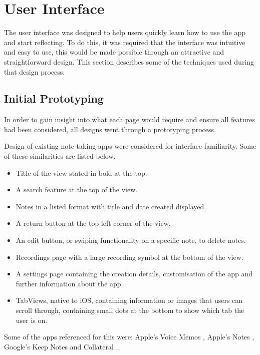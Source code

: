 \documentclass{l4proj}
\begin{document}
\section{User Interface}

The user interface was designed to help users quickly learn how to use the app and start reflecting. To do this, it was required that the interface was intuitive and easy to use, this would be made possible through an attractive and straightforward design. This section describes some of the techniques used during that design process.

\subsection{Initial Prototyping}

In order to gain insight into what each page would require and ensure all features had been considered, all designs went through a prototyping process. 

Design of existing note taking apps were considered for interface familiarity. Some of these similarities are listed below.
\begin{itemize}
    \item Title of the view stated in bold at the top.
    \item A search feature at the top of the view.
    \item Notes in a listed format with title and date created displayed.
    \item A return button at the top left corner of the view.
    \item An edit button, or swiping functionality on a specific note, to delete notes.
    \item Recordings page with a large recording symbol at the bottom of the view.
    \item A settings page containing the creation details, customisation of the app and further information about the app.
    \item TabViews, native to iOS, containing information or images that users can scroll through, containing small dots at the bottom to show which tab the user is on.
\end{itemize}

Some of the apps referenced for this were: Apple's Voice Memos \citep{apple_inc_voice_2021}, Apple's Notes \citep{apple_inc_notes_2021}, Google's Keep Notes \citep{google_llc_google_2021} and Collateral \citep{vargas_collateral_2021}.
\end{document}
